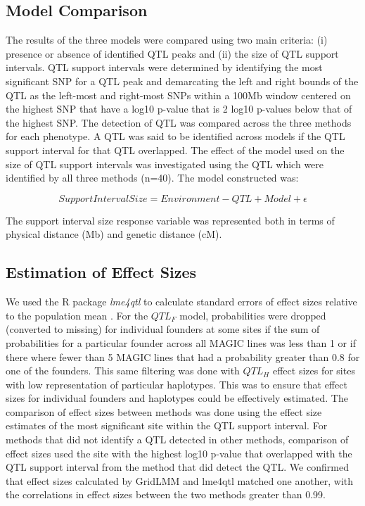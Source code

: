 \documentclass[article,9pt,twocolumn,twoside]{rilabRxiv}
\begin{document}
\subsection{Model Comparison}
The results of the three models were compared using two main criteria: (i) presence or absence of identified QTL peaks and (ii) the size of QTL support intervals.
QTL support intervals were determined by identifying the most significant SNP for a QTL peak and demarcating the left and right bounds of the QTL as the left-most and right-most SNPs within a 100Mb window centered on the highest SNP that have a log10 p-value that is 2 log10 p-values below that of the highest SNP.
The detection of QTL was compared across the three methods for each phenotype.
A QTL was said to be identified across models if the QTL support interval for that QTL overlapped.
The effect of the model used on the size of QTL support intervals was investigated using the QTL which were identified by all three methods (n=40). The model constructed was:

\begin{equation}
\label{eqn:bounds}
 Support Interval Size = Environment-QTL + Model + \epsilon
\end{equation}

The support interval size response variable was represented both in terms of physical distance (Mb) and genetic distance (cM).

\subsection{Estimation of Effect Sizes}
We used the R package \emph{lme4qtl} to calculate standard errors of effect sizes relative to the population mean \cite{Ziyatdinov}.
For the $QTL_F$ model, probabilities were dropped (converted to missing) for individual founders at some sites if the sum of probabilities for a particular founder across all MAGIC lines was less than 1 or if there where fewer than 5 MAGIC lines that had a probability greater than 0.8 for one of the founders.
This same filtering was done with $QTL_H$ effect sizes for sites with low representation of particular haplotypes.
This was to ensure that effect sizes for individual founders and haplotypes could be effectively estimated.
The comparison of effect sizes between methods was done using the effect size estimates of the most significant site within the QTL support interval.
For methods that did not identify a QTL detected in other methods, comparison of effect sizes used the site with the highest log10 p-value that overlapped with the QTL support interval from the method that did detect the QTL.
We confirmed that effect sizes calculated by GridLMM and lme4qtl matched one another, with the correlations in effect sizes between the two methods greater than 0.99.
\end{document}
